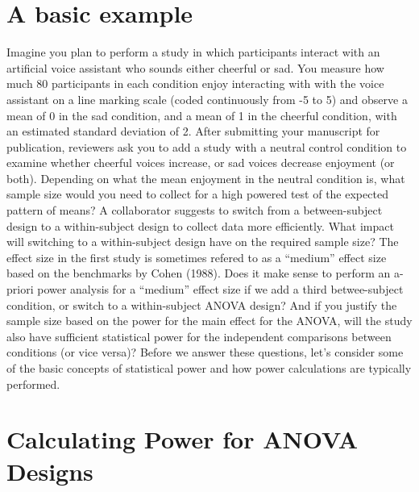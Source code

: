 \documentclass[
  ,man,floatsintext]{apa6}
\begin{document}
\hypertarget{a-basic-example}{%
\section{A basic example}\label{a-basic-example}}

Imagine you plan to perform a study in which participants interact with an artificial voice assistant who sounds either cheerful or sad.
You measure how much 80 participants in each condition enjoy interacting with with the voice assistant on a line marking scale (coded continuously from -5 to 5) and observe a mean of 0 in the sad condition, and a mean of 1 in the cheerful condition, with an estimated standard deviation of 2.
After submitting your manuscript for publication, reviewers ask you to add a study with a neutral control condition to examine whether cheerful voices increase, or sad voices decrease enjoyment (or both).
Depending on what the mean enjoyment in the neutral condition is, what sample size would you need to collect for a high powered test of the expected pattern of means?
A collaborator suggests to switch from a between-subject design to a within-subject design to collect data more efficiently.
What impact will switching to a within-subject design have on the required sample size?
The effect size in the first study is sometimes refered to as a \enquote{medium} effect size based on the benchmarks by Cohen (1988).
Does it make sense to perform an a-priori power analysis for a \enquote{medium} effect size if we add a third betwee-subject condition, or switch to a within-subject ANOVA design?
And if you justify the sample size based on the power for the main effect for the ANOVA, will the study also have sufficient statistical power for the independent comparisons between conditions (or vice versa)?
Before we answer these questions, let's consider some of the basic concepts of statistical power and how power calculations are typically performed.

\hypertarget{calculating-power-for-anova-designs}{%
\section{Calculating Power for ANOVA Designs}\label{calculating-power-for-anova-designs}}
\end{document}
